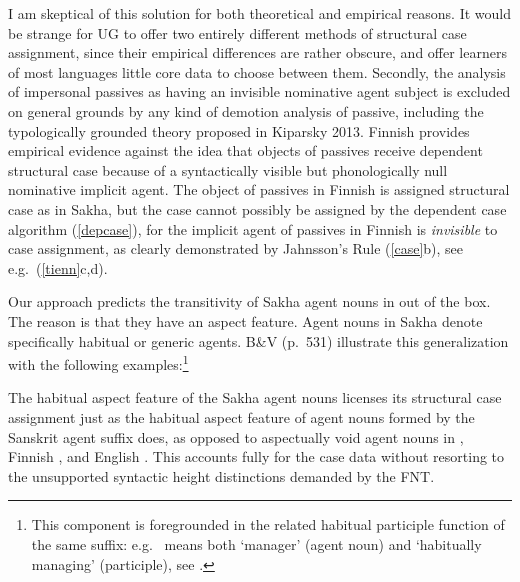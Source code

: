 \documentclass[output=paper,
modfonts
]{LSP/langsci}
\newcommand{\rf}[1]{(\ref{#1})}
\newcommand{\rfa}[2]{(\ref{#1}{#2})}
\def\urf#1{$^{\textrm{\scriptsize{#1}}}$}
\begin{document}
I am skeptical of this solution for both theoretical and empirical reasons.  It would be
strange for UG to offer two entirely different methods of structural case assignment, since
their empirical differences are rather obscure, and offer learners of most languages little
core data to choose between them.  Secondly, the analysis of impersonal passives as having an
invisible nominative agent subject is excluded on general grounds by any kind of demotion
analysis of passive, including the typologically grounded theory proposed in Kiparsky 2013.
Finnish provides empirical evidence against the idea that objects of passives receive dependent
structural case because of a syntactically visible but phonologically null nominative implicit
agent.  The object of passives in Finnish is assigned structural case as in Sakha, but the case
cannot possibly be assigned by the dependent case algorithm \rf{depcase}, for the implicit
agent of passives in Finnish is \textit{invisible} to case assignment, as clearly demonstrated
by Jahnsson's Rule \rfa{case}{b}, see e.g.\ \rfa{tienn}{c,d}.

Our approach predicts the transitivity of Sakha agent nouns in  out of the box.
The reason is that they have an aspect feature.  Agent nouns in Sakha  denote
specifically habitual or generic agents.  B\&V (p.\ 531) illustrate this generalization with
the following examples:\footnote{This component is foregrounded in the related habitual
  participle function of the same suffix:  e.g.\  means both `manager'
  (agent noun) and `habitually managing' (participle), see \citet[123]{vinokurova2005}.}
\begin{exe}
\ex
\begin{xlist}
\end{xlist}
\end{exe}
The habitual aspect feature of the Sakha agent nouns licenses its structural case assignment
just as the habitual aspect feature of agent nouns formed by the Sanskrit agent suffix
\form{′-tar-\urf{V}} does, as opposed to aspectually void agent nouns in
\form{-tár-\urf{N}}, Finnish , and English .  This accounts fully for
the case data without resorting to the unsupported syntactic height distinctions demanded by
the FNT.
\end{document}
